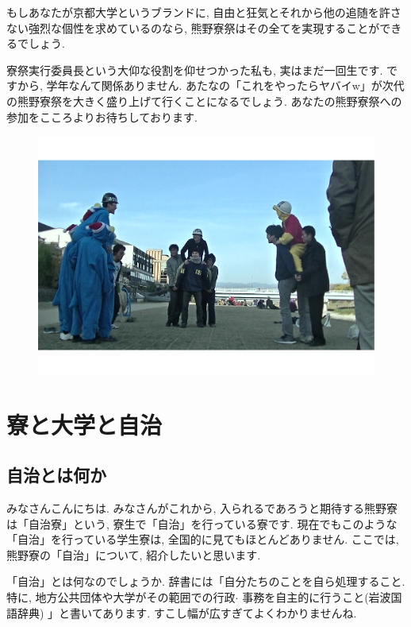 \documentclass[10pt,b5jsbook,dvips,dvipdfmx,openany]{jsbook}
\theoremstyle{definition}
\begin{document}
			もしあなたが京都大学というブランドに, 自由と狂気とそれから他の追随を許さない強烈な個性を求めているのなら, 熊野寮祭はその全てを実現することができるでしょう. 

			寮祭実行委員長という大仰な役割を仰せつかった私も, 実はまだ一回生です. ですから, 学年なんて関係ありません. あたなの「これをやったらヤバイw」が次代の熊野寮祭を大きく盛り上げて行くことになるでしょう. 
あなたの熊野寮祭への参加をこころよりお待ちしております. 
\begin{figure}[h]
		\begin{flushleft}
 	 	\includegraphics[scale=0.25]{kibasen.pdf}
		\end{flushleft}
		\end{figure}




\chapter{寮と大学と自治}

	\section{自治とは何か}

 	みなさんこんにちは. みなさんがこれから, 入られるであろうと期待する熊野寮は「自治寮」という, 寮生で「自治」を行っている寮です. 現在でもこのような「自治」を行っている学生寮は, 全国的に見てもほとんどありません. ここでは, 熊野寮の「自治」について, 紹介したいと思います. 

	「自治」とは何なのでしょうか. 辞書には「自分たちのことを自ら処理すること. 特に, 地方公共団体や大学がその範囲での行政$ \cdot $ 事務を自主的に行うこと(岩波国語辞典) 」と書いてあります. すこし幅が広すぎてよくわかりませんね. 
\end{document}
